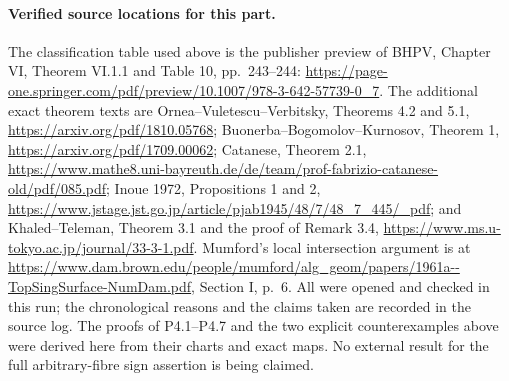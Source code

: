 \paragraph{Verified source locations for this part.}
The classification table used above is the publisher preview of
BHPV, Chapter VI, Theorem VI.1.1 and Table 10, pp.~243--244:
\url{https://page-one.springer.com/pdf/preview/10.1007/978-3-642-57739-0_7}.
The additional exact theorem texts are Ornea--Vuletescu--Verbitsky,
Theorems 4.2 and 5.1, \url{https://arxiv.org/pdf/1810.05768};
Buonerba--Bogomolov--Kurnosov, Theorem 1,
\url{https://arxiv.org/pdf/1709.00062}; Catanese, Theorem 2.1,
\url{https://www.mathe8.uni-bayreuth.de/de/team/prof-fabrizio-catanese-old/pdf/085.pdf};
Inoue 1972, Propositions 1 and 2,
\url{https://www.jstage.jst.go.jp/article/pjab1945/48/7/48_7_445/_pdf};
and Khaled--Teleman, Theorem 3.1 and the proof of Remark 3.4,
\url{https://www.ms.u-tokyo.ac.jp/journal/33-3-1.pdf}.
Mumford's local intersection argument is at
\url{https://www.dam.brown.edu/people/mumford/alg_geom/papers/1961a--TopSingSurface-NumDam.pdf},
Section I, p.~6. All were opened and checked in this run; the
chronological reasons and the claims taken are recorded in the
source log. The proofs of P4.1--P4.7 and the two explicit
counterexamples above were derived here from their charts and
exact maps. No external result for the full arbitrary-fibre sign
assertion is being claimed.
